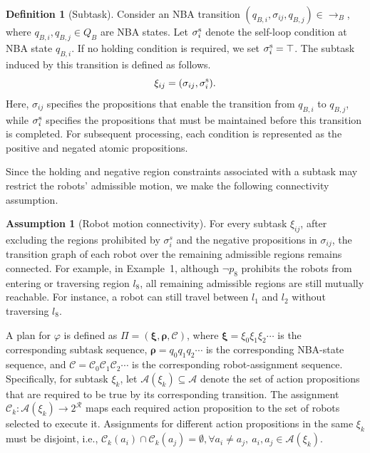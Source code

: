 \documentclass[lettersize,journal]{IEEEtran}
\theoremstyle{italiclemma}
\theoremstyle{italiclemma}
\theoremstyle{definition}
\newtheorem{definition}{Definition}
\newtheorem{assumption}{Assumption}
\begin{document}
\begin{definition}[Subtask]
Consider an NBA transition $(q_{B,i},\sigma_{ij},q_{B,j})\in\rightarrow_B$, where  \(q_{B,i},q_{B,j}\in Q_B\) are NBA states. Let $\sigma_i^{\rm s}$ denote the self-loop condition at NBA state $q_{B,i}$.   If no holding condition is required, we set \(\sigma_i^{\rm s}=\top\). The subtask induced by this  transition is defined as follows.
$$
\xi_{ij}=(\sigma_{ij},\sigma_i^{\rm s}).
$$
Here, $\sigma_{ij}$ specifies the propositions that enable the transition from $q_{B,i}$ to $q_{B,j}$, while
$\sigma_i^{\rm s}$ specifies the propositions that must be maintained before this transition is completed. For subsequent processing, each condition is represented as the positive and negated atomic propositions.
\end{definition}
Since the holding and negative region constraints associated with a subtask may restrict the robots' admissible motion, we make the following connectivity assumption.
\begin{assumption}[Robot motion connectivity] \label{assum:motion}
For every subtask $\xi_{ij}$, after excluding the regions prohibited by $\sigma_i^s$ and the negative propositions in $\sigma_{ij}$, the transition graph of each robot over the remaining admissible regions remains connected. For example, in Example~1, although $\neg p_8$ prohibits the robots from entering or traversing region $l_8$, all remaining admissible regions are still mutually reachable. For instance, a robot can still travel between $l_1$ and $l_2$ without traversing $l_8$.
\end{assumption}


A plan for $\varphi$ is defined as $\Pi=(\boldsymbol{\xi}, \boldsymbol{\rho}, \boldsymbol{\mathcal C})$, where $ \boldsymbol{\xi}=\xi_0\xi_1\xi_2\cdots$ is the corresponding subtask sequence, $\boldsymbol{\rho}=q_0q_1q_2\cdots$ is the corresponding NBA-state sequence, and $ \boldsymbol{\mathcal C}=\mathcal{C}_0\mathcal{C}_1\mathcal{C}_2\cdots$ is the corresponding robot-assignment sequence. Specifically,  for subtask $\xi_k$,  let $\mathcal A(\xi_k)\subseteq\mathcal A$ denote the set of action propositions that are required to be true by its corresponding transition. The assignment $ \mathcal{C}_k:\mathcal A(\xi_k)\rightarrow 2^{\mathcal R} $ maps each required action proposition to the set of robots selected to execute it. Assignments for different action propositions in the same $\xi_k$ must be disjoint, i.e., $ \mathcal{C}_k(a_i)\cap \mathcal{C}_k(a_j)=\emptyset, \forall a_i\neq a_j,\ a_i,a_j\in\mathcal A(\xi_k). $
\end{document}
